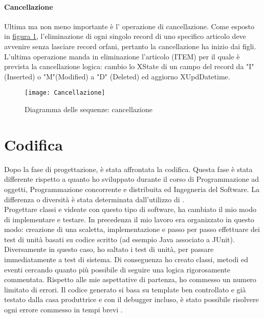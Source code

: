 \paragraph{Cancellazione}
Ultima ma non meno importante è l' operazione di cancellazione. Come esposto in \hyperref[DS:cancellazione]{figura \ref{DS:cancellazione}}, l'eliminazione di ogni singolo record di uno specifico articolo deve avvenire senza lasciare record orfani, pertanto la cancellazione ha inizio dai figli. L'ultima operazione manda in eliminazione l'articolo (ITEM) per il quale è prevista la cancellazione logica: cambio lo XState di un campo del record da "I" (Inserted) o "M"(Modified) a "D" (Deleted) ed aggiorno XUpdDatetime.

\begin{figure}[!h] 
	\centering 
	\texttt{[image: Cancellazione]} 
	\caption{Diagramma delle sequenze: cancellazione}
	\label{DS:cancellazione}
\end{figure}



\section{Codifica}
Dopo la fase di progettazione, è stata affrontata la codifica. Questa fase è stata differente rispetto a quanto ho sviluppato durante il corso di Programmazione ad oggetti, Programmazione concorrente e distribuita ed Ingegneria del Software. La differenza o diversità è stata determinata dall'utilizzo di \inde.\\
Progettare classi e videate con questo tipo di software, ha cambiato il mio modo di implementare e testare. In precedenza il mio lavoro era organizzato in questo modo: creazione di una scaletta, implementazione e passo per passo effettuare dei test di unità basati su codice scritto (ad esempio Java associato a JUnit).\\
Diversamente in questo caso, ho saltato i test di unità, per passare immediatamente a test di sistema. Di conseguenza ho creato classi, metodi ed eventi cercando quanto più possibile di seguire una logica rigorosamente commentata. 
Rispetto alle mie aspettative di partenza, ho commesso un numero limitato di errori. Il codice generato si basa su template ben controllato e già testato dalla casa produttrice e con il debugger incluso, è stato possibile risolvere ogni errore commesso in tempi brevi  .


